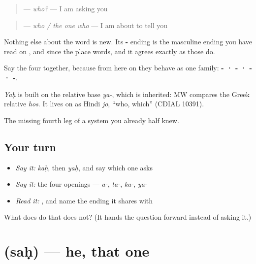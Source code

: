 \begin{quote}
\textbf{} — \emph{who?} — I am asking you
\end{quote}

\begin{quote}
\textbf{} — \emph{who / the one who} — I am about to tell you
\end{quote}

Nothing else about the word is new. Its \textbf{-} ending is the masculine ending you have read on \textbf{}, \textbf{} and \textbf{} since the place words, and it agrees exactly as those do.

Say the four together, because from here on they behave as one family: \textbf{- · - · - · -}.

\begin{cousinweb}
\emph{Yaḥ} is built on the relative base \emph{ya-}, which is inherited: MW compares the Greek relative \emph{hos}. It lives on as Hindi \emph{jo}, \textquotedblleft{}who, which\textquotedblright{} (CDIAL 10391).
\end{cousinweb}

\begin{grammarlens}[title={What you've built}]
The missing fourth leg of a system you already half knew.
\end{grammarlens}

\subsection*{Your turn}
\begin{itemize}
\raggedright
  \item \emph{Say it:} \emph{kaḥ}, then \emph{yaḥ}, and say which one asks
  \item \emph{Say it:} the four openings — \emph{a-}, \emph{ta-}, \emph{ka-}, \emph{ya-}
  \item \emph{Read it:} \textbf{}, and name the ending it shares with \textbf{}
\end{itemize}

\begin{tcolorbox}[breakable,colback=teal!4,colframe=teal!35!black,title={Before you move on}]
What does \textbf{} do that \textbf{} does not? (It hands the question forward instead of asking it.)
\end{tcolorbox}
\section[\texorpdfstring{\sk{सः} (saḥ)}{सः (saḥ)}]{ (saḥ) — he, that one}

